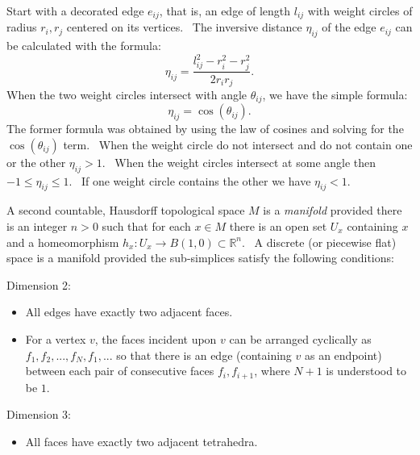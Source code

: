\begin{description}
\item[inversive distance] Start with a decorated edge $e_{ij}$, that is, an
edge of length $l_{ij}$ with weight circles of radius $r_{i},r_{j}$ centered
on its vertices. \ The inversive distance $\eta _{ij}$ of the edge $e_{ij}$
can be calculated with the formula:%
\begin{equation*}
\eta _{ij}=\frac{l_{ij}^{2}-r_{i}^{2}-r_{j}^{2}}{2r_{i}r_{j}}.
\end{equation*}%
When the two weight circles intersect with angle $\theta _{ij}$, we have the
simple formula:%
\begin{equation*}
\eta _{ij}=\cos \left( \theta _{ij}\right) .
\end{equation*}%
The former formula was obtained by using the law of cosines and solving for
the $\cos \left( \theta _{ij}\right) $ term. \ When the weight circle do not
intersect and do not contain one or the other $\eta _{ij}>1$. \ When the
weight circles intersect at some angle then $-1\leq \eta _{ij}\leq 1$. \ If
one weight circle contains the other we have $\eta _{ij}<1$. \ 

\item[manifold] A second countable, Hausdorff topological space $M$ is a 
\textit{manifold} provided there is an integer $n>0$ such that for each $%
x\in M$ there is an open set $U_{x}$ containing $x$ and a homeomorphism $%
h_{x}:U_{x}\rightarrow B\left( 1,0\right) \subset 
\mathbb{R}
^{n}$. \ A discrete (or piecewise flat) space is a manifold provided the
sub-simplices satisfy the following conditions:

\item Dimension 2:

\begin{itemize}
\item All edges have exactly two adjacent faces.

\item For a vertex $v$, the faces incident upon $v$ can be arranged
cyclically as $f_{1},f_{2},...,f_{N},f_{1},...$ so that there is an edge
(containing $v$ as an endpoint) between each pair of consecutive faces $%
f_{i},f_{i+1}$, where $N+1$ is understood to be $1$. \ 
\end{itemize}

\item Dimension 3:

\begin{itemize}
\item All faces have exactly two adjacent tetrahedra.


\end{itemize}
\end{description}
